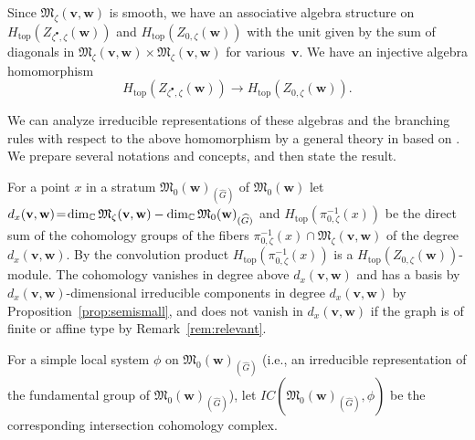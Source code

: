 \documentclass[pdftex]{sigma}
\theoremstyle{definition}
\numberwithin{equation}{section}
\newcommand{\propref}[1]{Proposition~\ref{#1}}
\newcommand{\remref}[1]{Remark~\ref{#1}}
\newcommand{\C}{{\mathbb C}}
\newcommand{\M}{{\mathfrak M}} %
\newcommand{\bv}{{\mathbf v}} %
\newcommand{\bw}{{\mathbf w}} %
\newcommand{\topdeg}{{\operatorname{top}}} %
\begin{document}
Since $\M_\zeta(\bv,\bw)$ is smooth, we have an associative algebra
structure on $H_\topdeg(Z_{\zeta^\bullet,\zeta}(\bw))$ and
$H_\topdeg(Z_{0,\zeta}(\bw))$ with the unit given by the sum of
diagonals in $\M_\zeta(\bv,\bw)\times\M_\zeta(\bv,\bw)$ for va\-rious~$\bv$.
%
We have an injective algebra homomorphism
\begin{equation}\label{eq:subalg}
    H_\topdeg(Z_{\zeta^\bullet,\zeta}(\bw)) \to
    H_\topdeg(Z_{0,\zeta}(\bw)).
\end{equation}

We can analyze irreducible representations of these algebras and the
branching rules with respect to the above homomorphism by a general
theory in \cite{CG} based on \cite{BM}. We prepare several notations
and concepts, and then state the result.

For a point $x$ in a stratum $\M_0(\bw)_{(\widehat G)}$ of
$\M_0(\bw)$ let $d_x(\bv,\bw)\! =\! \dim_\C \M_\zeta(\bv,\bw)
-\linebreak[2] \dim_\C \M_0(\bw)_{(\widehat G)}$ and
$H_\topdeg(\pi_{0,\zeta}^{-1}(x))$ be the direct sum of the cohomology
groups of the f\/ibers $\pi_{0,\zeta}^{-1}(x)\cap\M_\zeta(\bv,\bw)$ of
the degree $d_x(\bv,\bw)$.  By the convolution product
$H_\topdeg(\pi_{0,\zeta}^{-1}(x))$ is a
$H_\topdeg(Z_{0,\zeta}(\bw))$-module. The cohomology vanishes in
degree above $d_x(\bv,\bw)$ and has a basis by
$d_x(\bv,\bw)$-dimensional irreducible components in degree
$d_x(\bv,\bw)$ by \propref{prop:semismall}, and does not vanish in
$d_x(\bv,\bw)$ if the graph is of f\/inite or af\/f\/ine type by
\remref{rem:relevant}.

For a simple local system $\phi$ on $\M_0(\bw)_{(\widehat G)}$ (i.e.,
an irreducible representation of the fundamental group of
$\M_0(\bw)_{(\widehat G)}$), let $IC(\M_0(\bw)_{(\widehat G)}, \phi)$
be the corresponding intersection cohomology complex.
\end{document}
